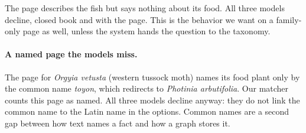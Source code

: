 The page describes the fish but says nothing about its food. All three models decline, closed book and with the page. This is the behavior we want on a family-only page as well, unless the system hands the question to the taxonomy.

\paragraph{A named page the models miss.}
The page for \emph{Orgyia vetusta} (western tussock moth) names its food plant only by the common name \emph{toyon}, which redirects to \emph{Photinia arbutifolia}. Our matcher counts this page as named. All three models decline anyway: they do not link the common name to the Latin name in the options. Common names are a second gap between how text names a fact and how a graph stores it.
